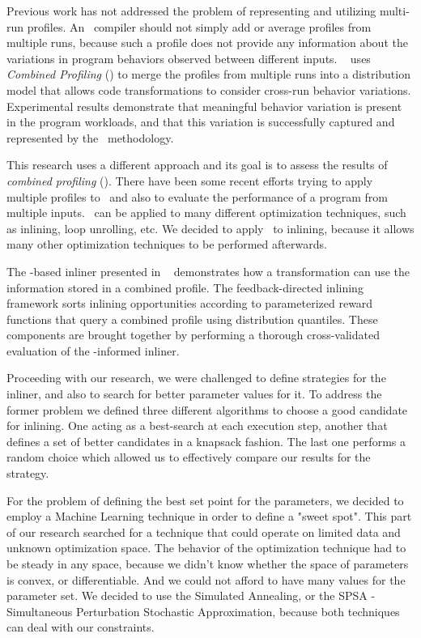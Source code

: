 Previous work has not addressed the problem of representing and
utilizing multi-run profiles.  An \FDO\ compiler should not simply add
or average profiles from multiple runs, because such a profile does
not provide any information about the variations in program behaviors
observed between different inputs. ~\cite{BerubePhD} uses {\it
Combined Profiling} (\CP) to merge the profiles from multiple runs
into a distribution model that allows code transformations to consider
cross-run behavior variations.  Experimental results demonstrate that
meaningful behavior variation is present in the program workloads,
and that this variation is successfully captured and represented by
the \CP\ methodology.


This research uses a different approach and its goal is to assess the results
of {\em combined profiling} (\CP). There have been some recent efforts trying
to apply multiple profiles to \FDO\, and also to evaluate the performance of a
program from multiple inputs. \CP\ can be applied to many different optimization
techniques, such as inlining, loop unrolling, etc. We decided to apply \CP\ to
inlining, because it allows many other optimization techniques to be performed
afterwards.


The \FDO-based inliner presented in ~\cite{BerubePhD}
demonstrates how a transformation can use the information stored in a
combined profile. The feedback-directed inlining framework sorts
inlining opportunities according to parameterized reward functions that
query a combined profile using distribution
quantiles.  These components are brought together by
performing a thorough cross-validated evaluation of the \CP-informed
inliner.


Proceeding with our research, we were challenged to define strategies for the
inliner, and also to search for better parameter values for it. To address the former
problem we defined three different algorithms to choose a good candidate for inlining.
One acting as a best-search at each execution step, another that defines a set of
better candidates in a knapsack fashion. The last one performs a random choice
which allowed us to effectively compare our results for the strategy.

For the problem of defining the best set point for the parameters, we decided to employ
a Machine Learning technique in order to define a "sweet spot". This part of our research
searched for a technique that could operate on limited data and unknown optimization
space. The behavior of the optimization technique had to be steady in any space, because
we didn't know whether the space of parameters is convex, or differentiable. And we could
not afford to have many values for the parameter set. We decided to use the Simulated
Annealing, or the SPSA - Simultaneous Perturbation Stochastic Approximation, because
both techniques can deal with our constraints.

